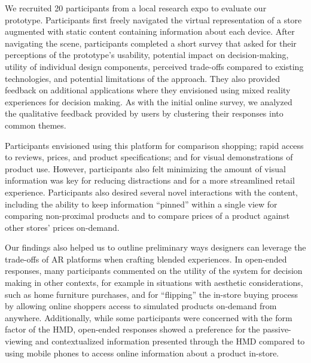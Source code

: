 We recruited 20 participants from a local research expo to evaluate our prototype. Participants first freely navigated the virtual representation of a store augmented with static content containing information about each device. After navigating the scene, participants completed a short survey that asked for their perceptions of the prototype's usability, potential impact on decision-making, utility of individual design components, perceived trade-offs compared to existing technologies, and potential limitations of the approach. They also provided feedback on additional applications where they envisioned using mixed reality experiences for decision making. As with the initial online survey, we analyzed the qualitative feedback provided by users by clustering their responses into common themes. 


Participants envisioned using this platform for comparison shopping; rapid access to reviews, prices, and product specifications; and for visual demonstrations of product use. However, participants also felt minimizing the amount of visual information was key for reducing distractions and for a more streamlined retail experience. 
Participants also desired several novel interactions with the content, including the ability to keep information ``pinned'' within a single view for comparing non-proximal products and to compare prices of a product against other stores' prices on-demand. 

Our findings also helped us to outline preliminary ways designers can leverage the trade-offs of AR platforms when crafting blended experiences. In open-ended responses, many participants commented on the utility of the system for decision making in other contexts, for example in situations with aesthetic considerations, such as home furniture purchases, and for ``flipping'' the in-store buying process by allowing online shoppers access to simulated products on-demand from anywhere. Additionally, while some participants were concerned with the form factor of the HMD, open-ended responses showed a preference for the passive-viewing and contextualized information presented through the HMD compared to using mobile phones to access online information about a product in-store. 

